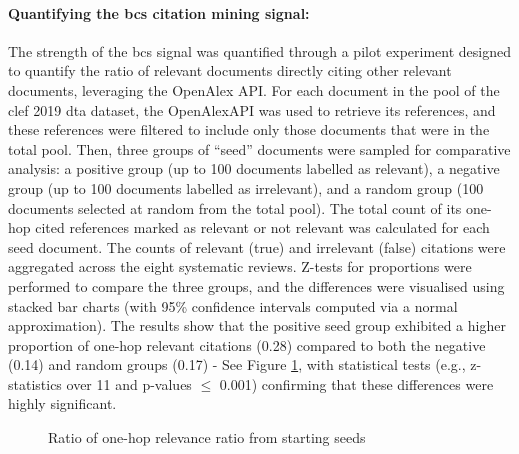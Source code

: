 \documentclass[10pt,oneside]{book}
\begin{document}
\paragraph{Quantifying the \gls*{bcs} citation mining signal:}
The strength of the \gls*{bcs} signal was quantified through a pilot experiment designed to quantify the ratio of relevant documents directly citing other relevant documents, leveraging the OpenAlex API. For each document in the pool of the \gls*{clef} 2019 \gls*{dta} dataset, the OpenAlexAPI was used to retrieve its references, and these references were filtered to include only those documents that were in the total pool. Then, three groups of ``seed” documents were sampled for comparative analysis: a positive group (up to 100 documents labelled as relevant), a negative group (up to 100 documents labelled as irrelevant), and a random group (100 documents selected at random from the total pool). The total count of its one-hop cited references marked as relevant or not relevant was calculated for each seed document. The counts of relevant (true) and irrelevant (false) citations were aggregated across the eight systematic reviews. Z-tests for proportions were performed to compare the three groups, and the differences were visualised using stacked bar charts (with 95\% confidence intervals computed via a normal approximation). The results show that the positive seed group exhibited a higher proportion of one-hop relevant citations (0.28) compared to both the negative (0.14) and random groups (0.17) - See Figure \ref{fig:bcs_experiement}, with statistical tests (e.g., z-statistics over 11 and p-values $\leq$ 0.001) confirming that these differences were highly significant.


\begin{figure}
    \centering
    
    \caption{Ratio of one-hop relevance ratio from starting seeds}
    \label{fig:bcs_experiement}
\end{figure}
\end{document}
